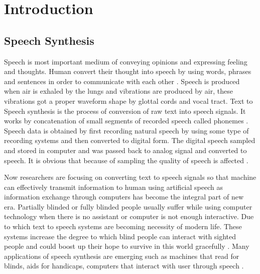 \chapter{Introduction}

\section{Speech Synthesis}

Speech is most important medium of conveying opinions and expressing feeling and thoughts.
Human convert their thought into speech by using words, phrases and sentences in order to communicate with each other \cite{mumtaz2016break}. 
Speech is produced when air is exhaled by the lungs and vibrations are produced by air, these vibrations got a 
proper waveform shape by glottal cords and vocal tract. Text to Speech synthesis is the process of conversion of raw text into 
speech signals. It works by concatenation of small segments of recorded speech called phonemes \cite{khilari2015review}. Speech data is obtained by first recording natural speech by using
some type of recording systems and then converted to digital form. The digital speech sampled and stored in computer and
was passed back to analog signal and converted to speech. It is obvious that because of sampling the quality of speech is
affected \cite{greene1986perception}. 

Now researchers are focusing on converting text to speech signals so that machine can effectively transmit
information to human using artificial speech as information exchange through computers has become the integral part of new
era. Partially blinded or fully blinded people usually suffer while using computer technology when there is no assistant or
computer is not enough interactive. Due to which text to speech systems are becoming necessity of modern life. These
systems increase the degree to which blind people can interact with sighted people \cite{klatt1987review} and could boost up
their hope to survive in this world gracefully \cite{aida2010main}. 
Many applications of speech synthesis are emerging such as machines that read for blinds, aids for handicaps, 
computers that interact with user through speech \cite{klatt1982klattalk}.

